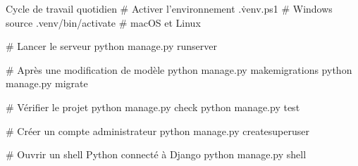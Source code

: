 \begin{codebox}[bash]{Cycle de travail quotidien}
# Activer l'environnement
.\.venv\Scripts\Activate.ps1     # Windows
source .venv/bin/activate         # macOS et Linux

# Lancer le serveur
python manage.py runserver

# Après une modification de modèle
python manage.py makemigrations
python manage.py migrate

# Vérifier le projet
python manage.py check
python manage.py test

# Créer un compte administrateur
python manage.py createsuperuser

# Ouvrir un shell Python connecté à Django
python manage.py shell
\end{codebox}
